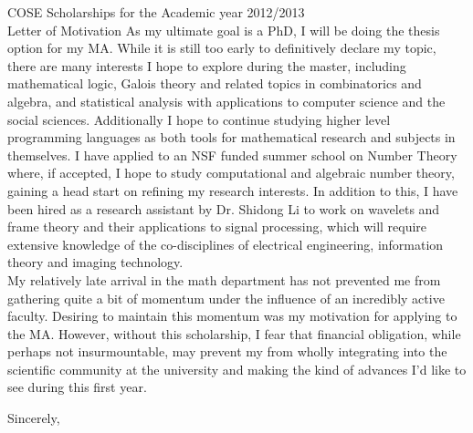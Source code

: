 \documentclass[11pt]{letter} %
\begin{document}
\begin{letter}{COSE Scholarships for the Academic year 2012/2013\\
 Letter of Motivation}
	As my ultimate goal is a PhD, I will be doing the thesis option for my MA. While it is still too early to definitively declare my topic, there are many interests I hope to explore during the master, including mathematical logic, Galois theory and related topics in combinatorics and algebra, and statistical analysis with applications to computer science and the social sciences.  Additionally I hope to continue studying higher level programming languages as both tools for mathematical research and subjects in themselves.  I have applied to an NSF funded summer school on Number Theory where, if accepted, I hope to study computational and algebraic number theory, gaining a head start on refining my research interests.   In addition to this, I have been hired as a research assistant by Dr. Shidong Li to work on wavelets and frame theory and their applications to signal processing, which will require extensive knowledge of the co-disciplines of electrical engineering, information theory and imaging technology.  \\
	
	My relatively late arrival in the math department has not prevented me from gathering quite a bit of momentum under the influence of an incredibly active faculty.  Desiring to maintain this momentum was my motivation for applying to the MA.  However, without this scholarship, I fear that financial obligation, while perhaps not insurmountable, may prevent my from wholly integrating into the scientific community at the university and making the kind of advances I'd like to see during this first year.  
	
	
    \closing{Sincerely,}
 
 

\end{letter}
 
\end{document}
